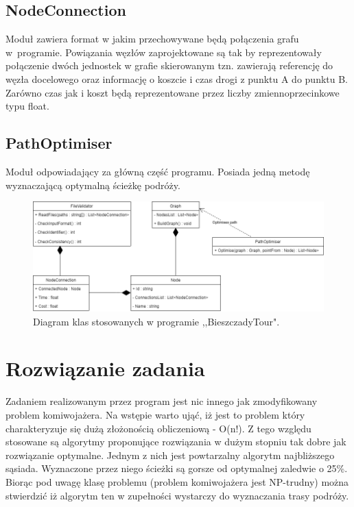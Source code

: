 \documentclass[10pt,oneside]{article}
\begin{document}
\subsection{NodeConnection}
Moduł zawiera format w jakim przechowywane będą połączenia grafu w~programie. Powiązania węzłów zaprojektowane są tak by reprezentowały połączenie dwóch jednostek w grafie skierowanym tzn. zawierają referencję do węzła docelowego oraz informację o koszcie i czas drogi z punktu A do punktu B. Zarówno czas jak i koszt będą reprezentowane przez liczby zmiennoprzecinkowe typu float. 
\subsection{PathOptimiser}
Moduł odpowiadający za główną część programu. Posiada jedną metodę wyznaczającą optymalną ścieżkę podróży.

\begin{figure}
	\includegraphics[scale=0.5]{diagram_klas.png}
	\caption{Diagram klas stosowanych w programie ,,BieszczadyTour".}
\end{figure}

\section{Rozwiązanie zadania}
Zadaniem realizowanym przez program jest nic innego jak zmodyfikowany problem komiwojażera. Na wstępie warto ująć, iż jest to problem który charakteryzuje się dużą złożonością obliczeniową - O(n!). Z tego względu stosowane są algorytmy proponujące rozwiązania w dużym stopniu tak dobre jak rozwiązanie optymalne. Jednym z nich jest powtarzalny algorytm najbliższego sąsiada. Wyznaczone przez niego ścieżki są gorsze od optymalnej zaledwie o 25\%. Biorąc pod uwagę klasę problemu (problem komiwojażera jest NP-trudny) można stwierdzić iż algorytm ten w zupełności wystarczy do wyznaczania trasy podróży.
\end{document}
